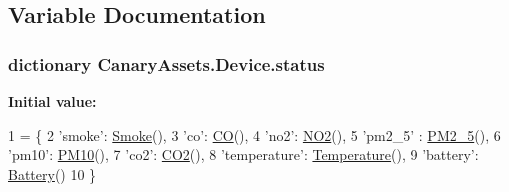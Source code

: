\subsection{Variable Documentation}
\hypertarget{namespace_canary_assets_1_1_device_af7b2d21f7ba7ccc8ef1352819b9e637d}{
\subsubsection[{status}]{\setlength{\rightskip}{0pt plus 5cm}dictionary Canary\-Assets.\-Device.\-status}}\label{namespace_canary_assets_1_1_device_af7b2d21f7ba7ccc8ef1352819b9e637d}
{\bfseries Initial value\-:}
\begin{DoxyCode}
1 = \{
2     \textcolor{stringliteral}{'smoke'}: \hyperlink{class_canary_models_1_1_smoke_1_1_smoke}{Smoke}(),
3     \textcolor{stringliteral}{'co'}: \hyperlink{class_canary_models_1_1_c_o_1_1_c_o}{CO}(),
4     \textcolor{stringliteral}{'no2'}: \hyperlink{class_canary_models_1_1_n_o2_1_1_n_o2}{NO2}(),
5     \textcolor{stringliteral}{'pm2\_5'} : \hyperlink{class_canary_models_1_1_p_m2__5_1_1_p_m2__5}{PM2\_5}(),
6     \textcolor{stringliteral}{'pm10'}: \hyperlink{class_canary_models_1_1_p_m10_1_1_p_m10}{PM10}(),
7     \textcolor{stringliteral}{'co2'}: \hyperlink{class_canary_models_1_1_c_o2_1_1_c_o2}{CO2}(),
8     \textcolor{stringliteral}{'temperature'}: \hyperlink{class_canary_models_1_1_temperature_1_1_temperature}{Temperature}(),
9     \textcolor{stringliteral}{'battery'}: \hyperlink{class_canary_models_1_1_battery_1_1_battery}{Battery}()
10 \}
\end{DoxyCode}
